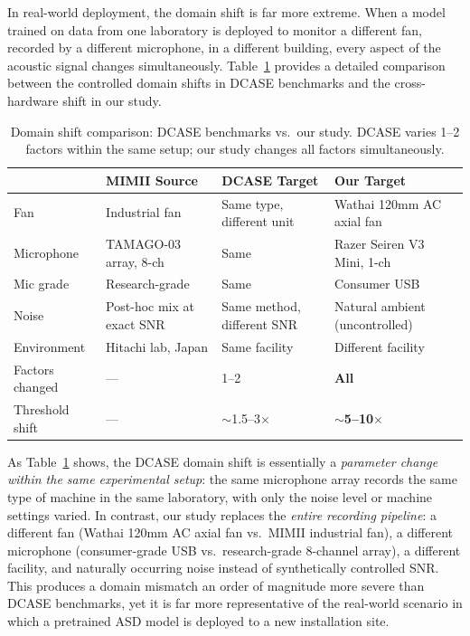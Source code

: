 \documentclass[12pt, a4paper]{article}
\begin{document}
In real-world deployment, the domain shift is far more extreme. When a model trained on data from one laboratory is deployed to monitor a different fan, recorded by a different microphone, in a different building, every aspect of the acoustic signal changes simultaneously. Table~\ref{tab:domain-shift-comparison} provides a detailed comparison between the controlled domain shifts in DCASE benchmarks and the cross-hardware shift in our study.

\begin{table}[htbp]
\centering
\caption{Domain shift comparison: DCASE benchmarks vs.\ our study. DCASE varies 1--2 factors within the same setup; our study changes all factors simultaneously.}
\label{tab:domain-shift-comparison}
\begin{tabular}{llll}
\toprule
 & \textbf{MIMII Source} & \textbf{DCASE Target} & \textbf{Our Target} \\
\midrule
Fan & Industrial fan & Same type, different unit & Wathai 120mm AC axial fan \\
Microphone & TAMAGO-03 array, 8-ch & Same & Razer Seiren V3 Mini, 1-ch \\
Mic grade & Research-grade & Same & Consumer USB \\
Noise & Post-hoc mix at exact SNR & Same method, different SNR & Natural ambient (uncontrolled) \\
Environment & Hitachi lab, Japan & Same facility & Different facility \\
\midrule
Factors changed & --- & 1--2 & \textbf{All} \\
Threshold shift & --- & $\sim$1.5--3$\times$ & $\sim$\textbf{5--10$\times$} \\
\bottomrule
\end{tabular}
\end{table}

As Table~\ref{tab:domain-shift-comparison} shows, the DCASE domain shift is essentially a \emph{parameter change within the same experimental setup}: the same microphone array records the same type of machine in the same laboratory, with only the noise level or machine settings varied. In contrast, our study replaces the \emph{entire recording pipeline}: a different fan (Wathai 120mm AC axial fan vs.\ MIMII industrial fan), a different microphone (consumer-grade USB vs.\ research-grade 8-channel array), a different facility, and naturally occurring noise instead of synthetically controlled SNR. This produces a domain mismatch an order of magnitude more severe than DCASE benchmarks, yet it is far more representative of the real-world scenario in which a pretrained ASD model is deployed to a new installation site.
\end{document}

